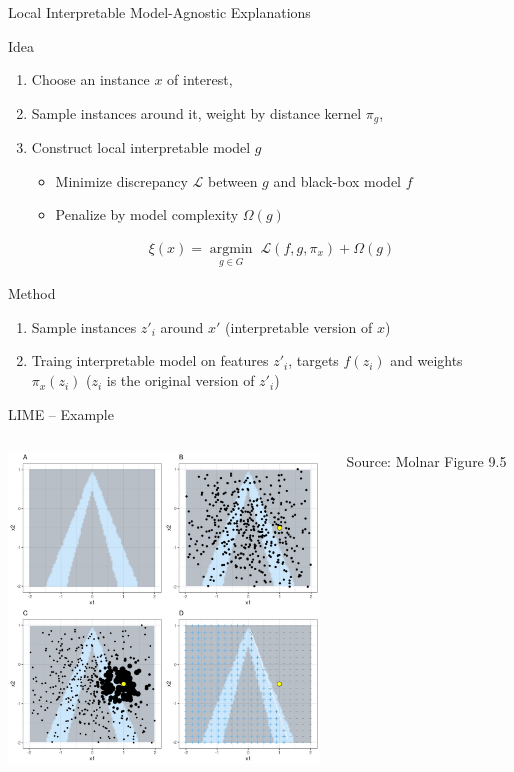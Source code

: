 \documentclass[ignorenonframetext,xcolor=x11names]{beamer}
\begin{document}
\begin{frame}{Local Interpretable Model-Agnostic Explanations}
\small
\begin{block}{Idea}
\begin{enumerate}
   \item Choose an instance $x$ of interest, 
   \item Sample instances around it, weight by distance kernel $\pi_g$,
   \item Construct local interpretable model $g$
   \begin{itemize}
   \item Minimize discrepancy $\mathcal{L}$ between $g$ and black-box model $f$
   \item Penalize by model complexity $\Omega(g)$
   \end{itemize}
\begin{align*}
\xi(x) = \operatorname*{argmin}_{g \in G} \; \mathcal{L} (f, g, \pi_x) + \Omega(g)
\end{align*}
\end{enumerate}
\end{block}


\begin{block}{Method}
\begin{enumerate}
  \item Sample instances $z'_i$ around $x'$ (interpretable version of $x$)
  \item Traing interpretable model on features $z'_i$, targets $f(z_i)$ and weights $\pi_x(z_i)$ ($z_i$ is the original version of $z'_i$)
\end{enumerate}
\end{block}
\end{frame}

\begin{frame}{LIME -- Example}
\begin{columns}
\begin{column}{.8\textwidth}
\includegraphics[height=3.25in]{molnar-9-5.jpeg} 
\end{column}
\begin{column}{.2\textwidth}
\scriptsize Source: Molnar Figure 9.5
\end{column}
\end{columns}
\end{frame}
\end{document}

